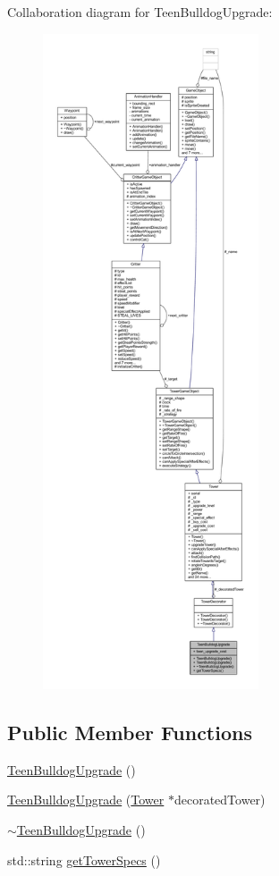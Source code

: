 Collaboration diagram for Teen\+Bulldog\+Upgrade\+:
\nopagebreak
\begin{figure}[H]
\begin{center}
\leavevmode
\includegraphics[height=550pt]{class_teen_bulldog_upgrade__coll__graph}
\end{center}
\end{figure}
\subsection*{Public Member Functions}
\begin{DoxyCompactItemize}
\item 
\hyperlink{class_teen_bulldog_upgrade_a3264266bfb7792eafdb96bc9225bd7c3}{Teen\+Bulldog\+Upgrade} ()
\item 
\hyperlink{class_teen_bulldog_upgrade_a6808367cbdaa1deed5780a916bf127cd}{Teen\+Bulldog\+Upgrade} (\hyperlink{class_tower}{Tower} $\ast$decorated\+Tower)
\item 
\hyperlink{class_teen_bulldog_upgrade_ac0e7021bb4066b4f9dba9961b4a38620}{$\sim$\+Teen\+Bulldog\+Upgrade} ()
\item 
std\+::string \hyperlink{class_teen_bulldog_upgrade_a2aea4581606c9dd178bb62f594da700d}{get\+Tower\+Specs} ()
\end{DoxyCompactItemize}

